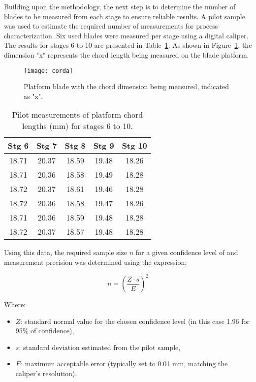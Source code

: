 Building upon the methodology, the next step is to determine the number of blades to be measured from each stage to ensure reliable results. 
A pilot sample was used to estimate the required number of measurements for process characterization.
Six used blades were measured per stage using a digital caliper. The results for stages 6 to 10 are presented in Table~\ref{tab:pilot_measurements}.
As shown in Figure~\ref{fig:corda}, the dimension "x" represents the chord length being measured on the blade platform.

\begin{figure}[H]
    \centering
    \texttt{[image: corda]}
    \caption{Platform blade with the chord dimension being measured, indicated as "x".}
    \label{fig:corda}
\end{figure}

\begin{table}[H]
    \centering
    \caption{Pilot measurements of platform chord lengths (mm) for stages 6 to 10.}
    \label{tab:pilot_measurements}
    \begin{tabular}{ccccc}
        \hline
        \textbf{Stg 6} & \textbf{Stg 7} & \textbf{Stg 8} & \textbf{Stg 9} & \textbf{Stg 10} \\
        \hline
        18.71 & 20.37 & 18.59 & 19.48 & 18.26 \\
        18.71 & 20.36 & 18.58 & 19.49 & 18.28 \\
        18.72 & 20.37 & 18.61 & 19.46 & 18.28 \\
        18.72 & 20.36 & 18.58 & 19.47 & 18.26 \\
        18.71 & 20.36 & 18.59 & 19.48 & 18.28 \\
        18.72 & 20.37 & 18.57 & 19.48 & 18.28 \\
        \hline
    \end{tabular}
\end{table}

Using this data, the required sample size \(n\) for a given confidence level of and measurement precision was determined using the expression:

\[
n = \left( \frac{Z \cdot s}{E} \right)^2
\]

Where:
\begin{itemize}
    \item \(Z\): standard normal value for the chosen confidence level (in this case 1.96 for 95\% of confidence),
    \item \(s\): standard deviation estimated from the pilot sample,
    \item \(E\): maximum acceptable error (typically set to 0.01 mm, matching the caliper's resolution).
\end{itemize}

